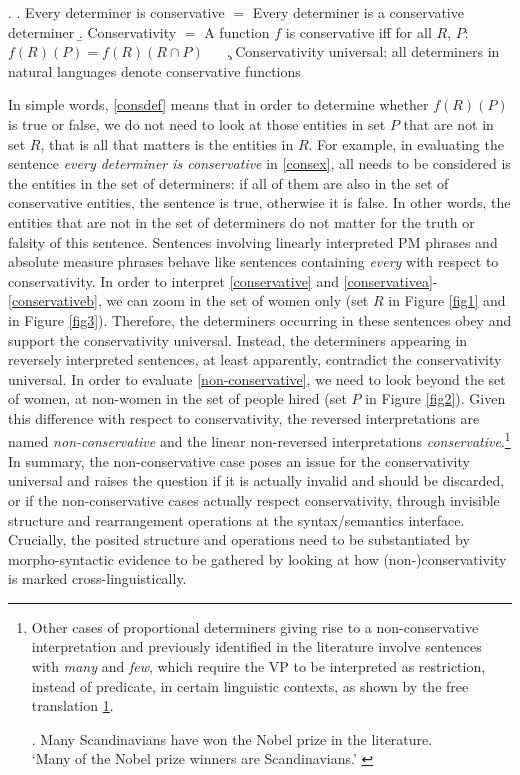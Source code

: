 \documentclass[charis, linguex]{glossa}
\begin{document}
\ex. \a. Every determiner is conservative $=$ Every determiner is a conservative determiner \label{consex} 
\b. Conservativity $=$ A function $f$ is conservative iff for all $R$, $P$: $f(R)(P) = f(R)(R \cap P)$ ~~ \label{consdef}
\c. Conservativity universal: all  determiners in natural languages denote conservative functions \label{conservativity}

In simple words, \ref{consdef} means that in order to determine whether
$f(R)(P)$ is true or false, we do not need to look at those entities in set $P$
that are not in set $R$, that is all that matters is the entities in $R$. For
example, in evaluating the sentence \textit{every determiner is conservative} in
\ref{consex}, all needs to be considered is the entities in the set of
determiners: if all of them are also in the set of conservative entities, the
sentence is true, otherwise it is false. In other words, the entities that are
not in the set of determiners do not matter for the truth or falsity of this
sentence. Sentences involving linearly interpreted PM phrases and absolute
measure phrases behave like sentences containing \textit{every} with respect to
conservativity. In order to interpret \ref{conservative} and
\ref{conservativea}-\ref{conservativeb}, we can zoom in the set of women only
(set $R$ in Figure \ref{fig1} and in Figure \ref{fig3}). Therefore, the
determiners occurring in these sentences obey and support the conservativity
universal. Instead, the determiners appearing in reversely interpreted
sentences, at least apparently, contradict the conservativity universal. In
order to evaluate \ref{non-conservative}, we need to look beyond the set of
women, at non-women in the set of people hired (set $P$ in Figure \ref{fig2}).
Given this difference with respect to conservativity, the reversed
interpretations are named \textit{non-conservative} and the linear
non-reversed interpretations \textit{conservative}.\footnote{Other cases of
proportional determiners giving rise to a non-conservative interpretation and
previously identified in the literature \citep{wes85} involve sentences with
\textit{many} and \textit{few}, which require the VP to be interpreted as
restriction, instead of predicate, in certain linguistic contexts, as shown by
the free translation \ref{Nobel}.

\exi. Many Scandinavians have won the Nobel prize in the literature. \\ `Many
of the Nobel prize winners are Scandinavians.' \label{Nobel}} In summary, the
non-conservative case poses an issue for the conservativity universal
and raises the question if it is actually invalid and should be discarded, or
if the non-conservative cases actually respect conservativity, through
invisible structure and rearrangement operations at the syntax/semantics
interface. Crucially, the posited structure and operations need to be
substantiated by morpho-syntactic evidence to be gathered by looking at how
(non-)conservativity is marked cross-linguistically.
\end{document}
